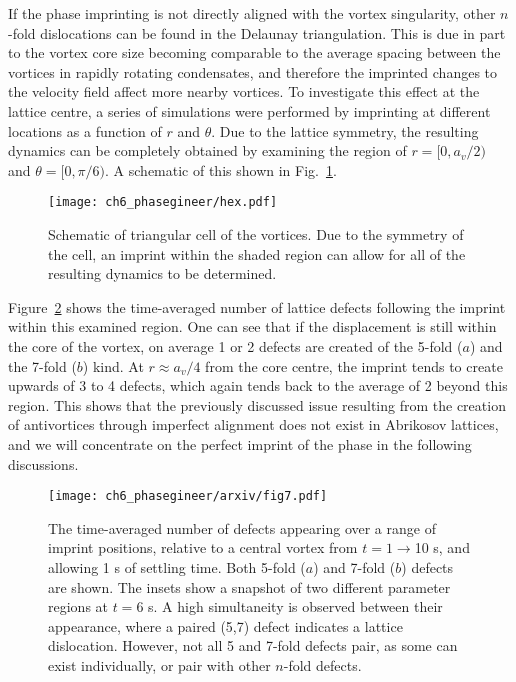 If the phase imprinting is not directly aligned with the vortex singularity, other $n$-fold dislocations can be found in the Delaunay triangulation. This is due in part to the vortex core size becoming comparable to the average spacing between the vortices in rapidly rotating condensates, and therefore the imprinted changes to the velocity field affect more nearby vortices. To investigate this effect at the lattice centre, a series of simulations were performed by imprinting at different locations as a function of $r$ and $\theta$. Due to the lattice symmetry, the resulting dynamics can be completely obtained by examining the region of $r=[0,a_v/2)$ and $\theta=[0,\pi/6)$. A schematic of this shown in Fig.~\ref{fig:hex}.

\begin{figure}\centering
    \texttt{[image: ch6\_phasegineer/hex.pdf]}
    \caption{Schematic of triangular cell of the vortices. Due to the symmetry of the cell, an imprint within the shaded region can allow for all of the resulting dynamics to be determined.} \label{fig:hex}
\end{figure}

Figure~\ref{fig:lattice_misalign} shows the time-averaged number of lattice defects following the imprint within this examined region. One can see that if the displacement is still within the core of the vortex, on average 1 or 2 defects are created of the 5-fold ($a$) and the 7-fold ($b$) kind. At $r\approx a_v/4$ from the core centre, the imprint tends to create upwards of 3 to 4 defects, which again tends back to the average of 2 beyond this region. This shows that the previously discussed issue resulting from the creation of antivortices through imperfect alignment does not exist in Abrikosov lattices, and we will concentrate on the perfect imprint of the phase in the following discussions.

\begin{figure}\centering
    \texttt{[image: ch6\_phasegineer/arxiv/fig7.pdf]}
    \caption{The time-averaged number of defects appearing over a range of imprint positions, relative to a central vortex from $t=1\rightarrow$10 s, and allowing 1 s of settling time. Both 5-fold ($a$) and 7-fold ($b$) defects are shown. The insets show a snapshot of two different parameter regions at $t=6$ s. A high simultaneity is observed between their appearance, where a paired (5,7) defect indicates a lattice dislocation. However, not all 5 and 7-fold defects pair, as some can exist individually, or pair with other $n$-fold defects.} \label{fig:lattice_misalign}
\end{figure}

